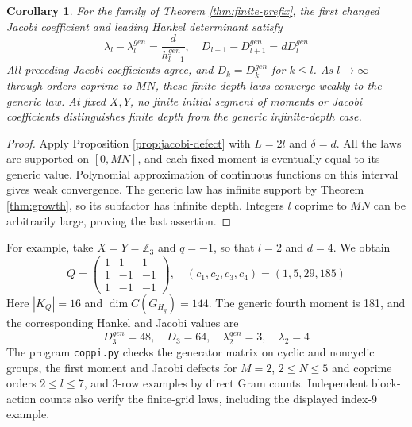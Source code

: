 \documentclass[11pt,reqno]{amsart}
\newtheorem{cor}[thm]{Corollary}
\theoremstyle{definition}
\numberwithin{equation}{section}
\begin{document}
\begin{cor}\label{cor:finite-jacobi}
For the family of Theorem \ref{thm:finite-prefix}, the first changed Jacobi coefficient and leading Hankel determinant satisfy
$$\lambda_l-\lambda_l^{gen}=\frac d{h_{l-1}^{gen}},\quad D_{l+1}-D_{l+1}^{gen}=dD_l^{gen}$$
All preceding Jacobi coefficients agree, and $D_k=D_k^{gen}$ for $k\leq l$. As $l\to\infty$ through orders coprime to $MN$, these finite-depth laws converge weakly to the generic law. At fixed $X,Y$, no finite initial segment of moments or Jacobi coefficients distinguishes finite depth from the generic infinite-depth case.
\end{cor}
\begin{proof}
Apply Proposition \ref{prop:jacobi-defect} with $L=2l$ and $\delta=d$. All the laws are supported on $[0,MN]$, and each fixed moment is eventually equal to its generic value. Polynomial approximation of continuous functions on this interval gives weak convergence. The generic law has infinite support by Theorem \ref{thm:growth}, so its subfactor has infinite depth. Integers $l$ coprime to $MN$ can be arbitrarily large, proving the last assertion.
\end{proof}

For example, take $X=Y=\mathbb Z_3$ and $q=-1$, so that $l=2$ and $d=4$. We obtain
$$Q=\begin{pmatrix}1&1&1\\1&-1&-1\\1&-1&-1\end{pmatrix},\quad(c_1,c_2,c_3,c_4)=(1,5,29,185)$$
Here $|K_Q|=16$ and $\dim C(G_{H_q})=144$. The generic fourth moment is 181, and the corresponding Hankel and Jacobi values are
$$D_3^{gen}=48,\quad D_3=64,\quad\lambda_2^{gen}=3,\quad\lambda_2=4$$
The program \texttt{coppi.py} checks the generator matrix on cyclic and noncyclic groups, the first moment and Jacobi defects for $M=2$, $2\leq N\leq5$ and coprime orders $2\leq l\leq7$, and 3-row examples by direct Gram counts. Independent block-action counts also verify the finite-grid laws, including the displayed index-9 example.
\end{document}
